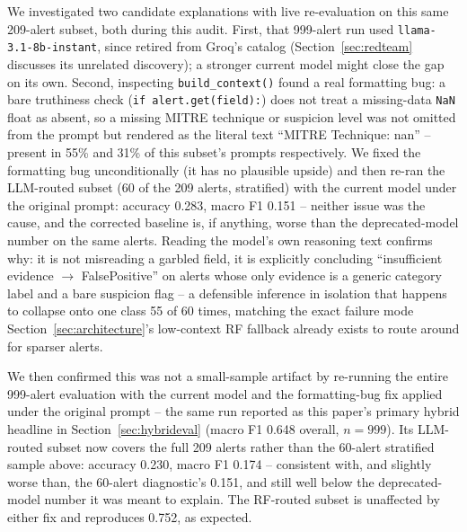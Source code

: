 \documentclass[conference]{IEEEtran}
\begin{document}
We investigated two candidate explanations with live re-evaluation on this same 209-alert subset,
both during this audit. First, that 999-alert run used \texttt{llama-3.1-8b-instant}, since retired
from Groq's catalog (Section~\ref{sec:redteam} discusses its unrelated discovery); a stronger
current model might close the gap on its own. Second, inspecting \texttt{build\_context()} found a
real formatting bug: a bare truthiness check (\texttt{if alert.get(field):}) does not treat a
missing-data \texttt{NaN} float as absent, so a missing MITRE technique or suspicion level was not
omitted from the prompt but rendered as the literal text ``MITRE Technique: nan'' -- present in 55\%
and 31\% of this subset's prompts respectively. We fixed the formatting bug unconditionally (it has
no plausible upside) and then re-ran the LLM-routed subset (60 of the 209 alerts, stratified) with
the current model under the original prompt: accuracy 0.283, macro F1 0.151 -- neither issue was
the cause, and the corrected baseline is, if anything, worse than the deprecated-model number on the
same alerts. Reading the model's own reasoning text confirms why: it is not misreading a garbled
field, it is explicitly concluding ``insufficient evidence $\rightarrow$ FalsePositive'' on alerts
whose only evidence is a generic category label and a bare suspicion flag -- a defensible
inference in isolation that happens to collapse onto one class 55 of 60 times, matching the exact
failure mode Section~\ref{sec:architecture}'s low-context RF fallback already exists to route around
for sparser alerts.

We then confirmed this was not a small-sample artifact by re-running the entire 999-alert
evaluation with the current model and the formatting-bug fix applied under the original prompt --
the same run reported as this paper's primary hybrid headline in
Section~\ref{sec:hybrideval} (macro F1 0.648 overall, $n{=}999$). Its LLM-routed subset now
covers the full 209 alerts rather than the 60-alert stratified sample above: accuracy 0.230,
macro F1 0.174 -- consistent with, and slightly worse than, the 60-alert diagnostic's 0.151, and
still well below the deprecated-model number it was meant to explain. The RF-routed subset is
unaffected by either fix and reproduces 0.752, as expected.
\end{document}
